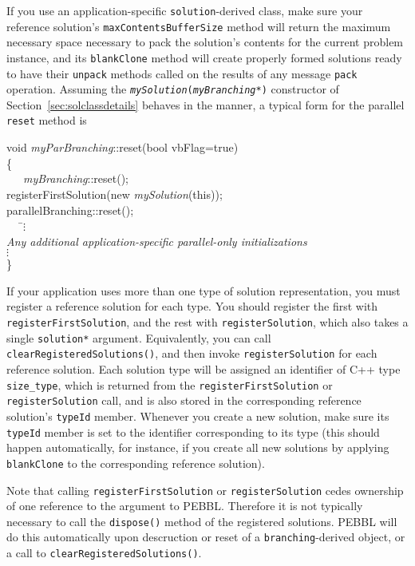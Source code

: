 If you use an application-specific \texttt{solution}-derived class,
make sure your reference solution's \texttt{maxContentsBufferSize}
method will return the maximum necessary space necessary to pack the
solution's contents for the current problem instance, 
and its \texttt{blankClone} method will create
properly formed solutions ready to have their \texttt{unpack} methods
called on the results of any message \texttt{pack} operation.  Assuming the
\texttt{\emph{mySolution}(\emph{myBranching}*)} constructor
of Section~\ref{sec:solclassdetails} behaves in the manner, a typical
form for the parallel \texttt{reset} method is
\begin{codeblock}
void \emph{myParBranching}::reset(bool vbFlag=true) \\
\{ \\
~~~\= \emph{myBranching}::reset();\\
   \> registerFirstSolution(new \emph{mySolution}(this));\\
   \> parallelBranching::reset(); \\
   \> ~~~\=$\vdots$ \\
   \> \textrm{\emph{Any additional application-specific parallel-only
                    initializations}} \\
   \>\> $\vdots$ \\
\}
\end{codeblock}

If your application uses more than one type of solution
representation, you must register a reference solution for each type.
You should register the first with
\texttt{registerFirstSolution}, and the rest with
\texttt{registerSolution}, which also takes a single
\texttt{solution*} argument.  Equivalently, you can call
\texttt{clearRegisteredSolutions()}, and then invoke
\texttt{registerSolution} for each reference solution.  Each solution
type will be assigned an identifier of C++ type \texttt{size\_type},
which is returned from the \texttt{registerFirstSolution} or
\texttt{registerSolution} call, and is also stored in the corresponding
reference solution's \texttt{typeId} member.  Whenever you create a
new solution, make sure its \texttt{typeId} member is set to the
identifier corresponding to its type (this should happen
automatically, for instance, if you create all new solutions by
applying \texttt{blankClone} to the corresponding reference solution).

Note that calling \texttt{registerFirstSolution} or
\texttt{registerSolution} cedes ownership of one reference to the argument to
PEBBL.  Therefore it is not typically necessary to call the \texttt{dispose()}
method of the registered solutions.  PEBBL will do this automatically upon
descruction or reset of a \texttt{branching}-derived object, or a call to
\texttt{clearRegisteredSolutions()}.

